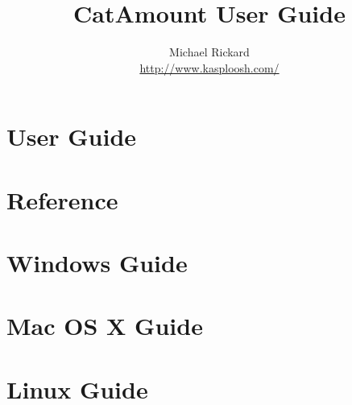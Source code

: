 \documentclass[12pt,letterpaper,oneside,openany]{book}
\begin{document}
\title{CatAmount User Guide}
\author{Michael Rickard\\
  \url{http://www.kasploosh.com/}}
\maketitle



\tableofcontents

\part{User Guide}













\part{Reference}





\part{Windows Guide}





\part{Mac OS X Guide}





\part{Linux Guide}





\appendix

\end{document}
